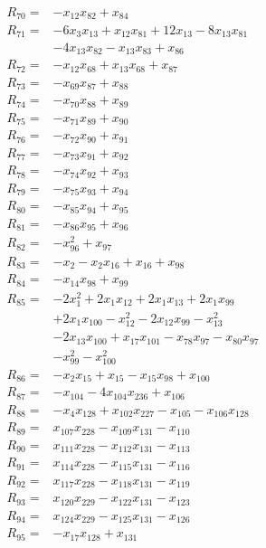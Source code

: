 \begin{align*}
R_{70}={}&-x_{12}x_{82} +x_{84}\\[3pt]
R_{71}={}&-6x_{3}x_{13} +x_{12}x_{81} +12x_{13} -8x_{13}x_{81}\\
&-4x_{13}x_{82} -x_{13}x_{83} +x_{86}\\[3pt]
R_{72}={}&-x_{12}x_{68} +x_{13}x_{68} +x_{87}\\[3pt]
R_{73}={}&-x_{69}x_{87} +x_{88}\\[3pt]
R_{74}={}&-x_{70}x_{88} +x_{89}\\[3pt]
R_{75}={}&-x_{71}x_{89} +x_{90}\\[3pt]
R_{76}={}&-x_{72}x_{90} +x_{91}\\[3pt]
R_{77}={}&-x_{73}x_{91} +x_{92}\\[3pt]
R_{78}={}&-x_{74}x_{92} +x_{93}\\[3pt]
R_{79}={}&-x_{75}x_{93} +x_{94}\\[3pt]
R_{80}={}&-x_{85}x_{94} +x_{95}\\[3pt]
R_{81}={}&-x_{86}x_{95} +x_{96}\\[3pt]
R_{82}={}&-x_{96}^{2} +x_{97}\\[3pt]
R_{83}={}&-x_{2} -x_{2}x_{16} +x_{16} +x_{98}\\[3pt]
R_{84}={}&-x_{14}x_{98} +x_{99}\\[3pt]
R_{85}={}&-2x_{1}^{2} +2x_{1}x_{12} +2x_{1}x_{13} +2x_{1}x_{99}\\
&+2x_{1}x_{100} -x_{12}^{2} -2x_{12}x_{99} -x_{13}^{2}\\
&-2x_{13}x_{100} +x_{17}x_{101} -x_{78}x_{97} -x_{80}x_{97}\\
&-x_{99}^{2} -x_{100}^{2}\\[3pt]
R_{86}={}&-x_{2}x_{15} +x_{15} -x_{15}x_{98} +x_{100}\\[3pt]
R_{87}={}&-x_{104} -4x_{104}x_{236} +x_{106}\\[3pt]
R_{88}={}&-x_{4}x_{128} +x_{102}x_{227} -x_{105} -x_{106}x_{128}\\[3pt]
R_{89}={}&x_{107}x_{228} -x_{109}x_{131} -x_{110}\\[3pt]
R_{90}={}&x_{111}x_{228} -x_{112}x_{131} -x_{113}\\[3pt]
R_{91}={}&x_{114}x_{228} -x_{115}x_{131} -x_{116}\\[3pt]
R_{92}={}&x_{117}x_{228} -x_{118}x_{131} -x_{119}\\[3pt]
R_{93}={}&x_{120}x_{229} -x_{122}x_{131} -x_{123}\\[3pt]
R_{94}={}&x_{124}x_{229} -x_{125}x_{131} -x_{126}\\[3pt]
R_{95}={}&-x_{17}x_{128} +x_{131}\\[3pt]

\end{align*}
